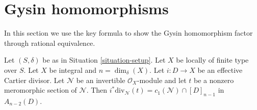 \section{Gysin homomorphisms}
\label{section-gysin}

\noindent
In this section we use the key formula to show the Gysin homomorphism
factor through rational equivalence.

\begin{lemma}
\label{lemma-gysin-factors-general}
Let $(S, \delta)$ be as in Situation \ref{situation-setup}.
Let $X$ be locally of finite type over $S$.
Let $X$ be integral and $n = \dim_\delta(X)$.
Let $i : D \to X$ be an effective Cartier divisor.
Let $\mathcal{N}$ be an invertible $\mathcal{O}_X$-module
and let $t$ be a nonzero meromorphic section of $\mathcal{N}$.
Then $i^*\text{div}_\mathcal{N}(t) = c_1(\mathcal{N}) \cap [D]_{n - 1}$
in $A_{n - 2}(D)$.
\end{lemma}

